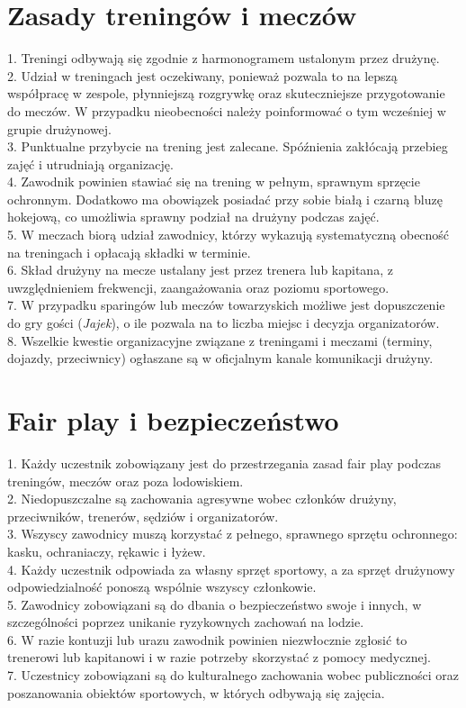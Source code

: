 \documentclass[12pt,a4paper]{article}
\begin{document}
\section{Zasady treningów i meczów}
1. Treningi odbywają się zgodnie z harmonogramem ustalonym przez drużynę.\\
2. Udział w treningach jest oczekiwany, ponieważ pozwala to na lepszą współpracę w zespole, płynniejszą rozgrywkę oraz skuteczniejsze przygotowanie do meczów. W przypadku nieobecności należy poinformować o tym wcześniej w grupie drużynowej.\\
3. Punktualne przybycie na trening jest zalecane. Spóźnienia zakłócają przebieg zajęć i utrudniają organizację.\\
4. Zawodnik powinien stawiać się na trening w pełnym, sprawnym sprzęcie ochronnym. Dodatkowo ma obowiązek posiadać przy sobie białą i czarną bluzę hokejową, co umożliwia sprawny podział na drużyny podczas zajęć.\\
5. W meczach biorą udział zawodnicy, którzy wykazują systematyczną obecność na treningach i opłacają składki w terminie.\\
6. Skład drużyny na mecze ustalany jest przez trenera lub kapitana, z uwzględnieniem frekwencji, zaangażowania oraz poziomu sportowego.\\
7. W przypadku sparingów lub meczów towarzyskich możliwe jest dopuszczenie do gry gości (\textit{Jajek}), o ile pozwala na to liczba miejsc i decyzja organizatorów.\\
8. Wszelkie kwestie organizacyjne związane z treningami i meczami (terminy, dojazdy, przeciwnicy) ogłaszane są w oficjalnym kanale komunikacji drużyny.

\section{Fair play i bezpieczeństwo}
1. Każdy uczestnik zobowiązany jest do przestrzegania zasad fair play podczas treningów, meczów oraz poza lodowiskiem.\\
2. Niedopuszczalne są zachowania agresywne wobec członków drużyny, przeciwników, trenerów, sędziów i organizatorów.\\
3. Wszyscy zawodnicy muszą korzystać z pełnego, sprawnego sprzętu ochronnego: kasku, ochraniaczy, rękawic i łyżew.\\
4. Każdy uczestnik odpowiada za własny sprzęt sportowy, a za sprzęt drużynowy odpowiedzialność ponoszą wspólnie wszyscy członkowie.\\
5. Zawodnicy zobowiązani są do dbania o bezpieczeństwo swoje i innych, w szczególności poprzez unikanie ryzykownych zachowań na lodzie.\\
6. W razie kontuzji lub urazu zawodnik powinien niezwłocznie zgłosić to trenerowi lub kapitanowi i w razie potrzeby skorzystać z pomocy medycznej.\\
7. Uczestnicy zobowiązani są do kulturalnego zachowania wobec publiczności oraz poszanowania obiektów sportowych, w których odbywają się zajęcia.
\end{document}

